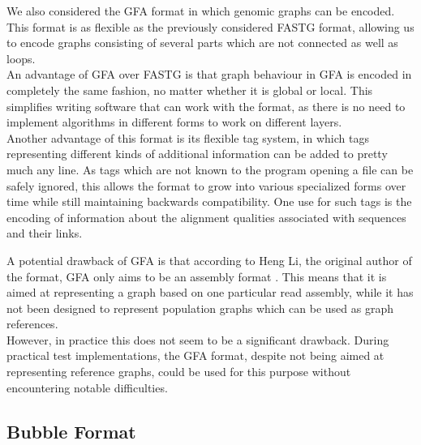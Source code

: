 \documentclass[a4paper,12pt,twoside,BCOR=10mm]{scrbook}
\begin{document}
We also considered the GFA format in which genomic graphs can be encoded.
This format is as flexible as the previously considered FASTG format, allowing us to encode graphs consisting of
several parts which are not connected as well as loops. \\
An advantage of GFA over FASTG is that
graph behaviour in GFA is encoded in completely the same fashion, no matter whether it is global
or local. This simplifies writing software that can work with the format,
as there is no need to implement algorithms in different forms to work on
different layers. \\
Another advantage of this format is its flexible tag system, in which tags representing different kinds of
additional information can be added to pretty much any line. As tags which are not known to the program
opening a file can be safely ignored, this allows the format to grow into various specialized forms over
time while still maintaining backwards compatibility.
One use for such tags is the encoding of information about the alignment qualities associated with sequences and their links.

A potential drawback of GFA is that
according to Heng Li, the original author of the format, GFA only aims to be an assembly format \citep{specGFA3}.
This means that it is aimed at representing a graph based on one particular read assembly,
while it has not been designed to represent population graphs which can be used as graph references. \\
However, in practice this does not seem to be a significant drawback.
During practical test implementations, the GFA format, despite not being aimed at representing reference graphs,
could be used for this purpose without encountering notable difficulties.

\subsection{Bubble Format}
\end{document}
